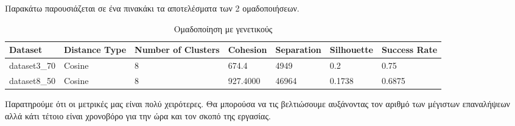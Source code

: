  
 Παρακάτω παρουσιάζεται σε ένα πινακάκι τα αποτελέσματα των 2 ομαδοποιήσεων.
 
 \begin{table}[]
 	\centering
 	\caption{Ομαδοποίηση με γενετικούς}
 	\label{my-label}
 	\begin{tabular}{lllllll}
 		\hline
 		Dataset      & Distance Type & Number of Clusters & Cohesion & Separation & Silhouette & Success Rate \\ \hline
 		dataset3\_70 & Cosine        & 8                  & 674.4    & 4949       & 0.2        & 0.75         \\
 		dataset8\_50 & Cosine        & 8                  & 927.4000 & 46964      & 0.1738     & 0.6875      
 	\end{tabular}
 \end{table}
 
 Παρατηρούμε ότι οι μετρικές μας είναι πολύ χειρότερες. Θα μπορούσα να τις βελτιώσουμε αυξάνοντας τον αριθμό των μέγιστων επαναλήψεων αλλά κάτι τέτοιο είναι χρονοβόρο για την ώρα και τον σκοπό της εργασίας.
 
 